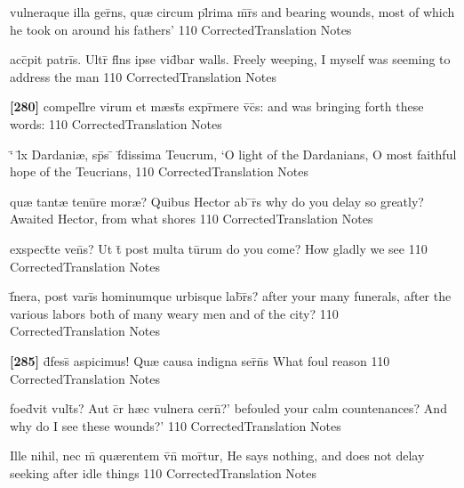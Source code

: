 \latline
  {vulneraque illa ger\={}ns, qu{\ae} circum pl\={}rima m\={}r\={}s}
  { and bearing wounds, most of which he took on around his fathers' }
  {110}
  { CorrectedTranslation }
  { Notes }


\latline
  {acc\={}pit patri\={}s.  Ultr\={} fl\={}ns ipse vid\={}bar}
  { walls.  Freely weeping, I myself was seeming to address the man}
  {110}
  { CorrectedTranslation }
  { Notes }


\latline
  {\textbf{[280]} compell\={}re virum et m{\ae}st\={}s expr\={}mere v\={}c\={}s:}
  { and was bringing forth these words: }
  {110}
  { CorrectedTranslation }
  { Notes }


\latline
  {`\={} l\={}x Dardani{\ae}, sp\={}s \={} f\={\macron {\i}}dissima Teucrum,}
  { `O light of the Dardanians, O most faithful hope of the Teucrians, }
  {110}
  { CorrectedTranslation }
  { Notes }


\latline
  {qu{\ae} tant{\ae} tenu\={}re mor{\ae}?  Quibus Hector ab \={}r\={\macron {\i}}s}
  { why do you delay so greatly?  Awaited Hector, from what shores }
  {110}
  { CorrectedTranslation }
  { Notes }


\latline
  {exspect\={}te ven\={\macron {\i}}s?  Ut t\={} post multa tu\={}rum}
  { do you come?  How gladly we see }
  {110}
  { CorrectedTranslation }
  { Notes }


\latline
  {f\={}nera, post vari\={}s hominumque urbisque lab\={}r\={}s?}
  { after your many funerals, after the various labors both of many weary men and of the city? }
  {110}
  { CorrectedTranslation }
  { Notes }


\latline
  {\textbf{[285]} d\={}fess\={\macron {\i}}  aspicimus!  Qu{\ae} causa indigna ser\={}n\={}s}
  {  What foul reason }
  {110}
  { CorrectedTranslation }
  { Notes }


\latline
  {foed\={}vit vult\={}s?  Aut c\={}r h{\ae}c vulnera cern\={}?'}
  { befouled your calm countenances?  And why do I see these wounds?' }
  {110}
  { CorrectedTranslation }
  { Notes }


\latline
  {Ille nihil, nec m\={} qu{\ae}rentem v\={}n\={} mor\={}tur,}
  { He says nothing, and does not delay seeking after idle things }
  {110}
  { CorrectedTranslation }
  { Notes }


